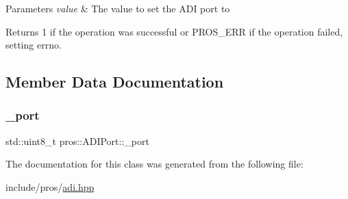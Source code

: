 \begin{DoxyParams}{Parameters}
{\em value} & The value to set the A\+DI port to\\
\hline
\end{DoxyParams}
\begin{DoxyReturn}{Returns}
1 if the operation was successful or P\+R\+O\+S\+\_\+\+E\+RR if the operation failed, setting errno. 
\end{DoxyReturn}


\subsection{Member Data Documentation}
\mbox{\label{classpros_1_1ADIPort_a75f3b6c1ae3c1f6b755e18444e7559d6}} 
\subsubsection{\texorpdfstring{\_port}{\_port}}
{\footnotesize\ttfamily std\+::uint8\+\_\+t pros\+::\+A\+D\+I\+Port\+::\+\_\+port\hspace{0.3cm}{\ttfamily [protected]}}



The documentation for this class was generated from the following file\+:\begin{DoxyCompactItemize}
\item 
include/pros/\mbox{\hyperlink{adi_8hpp}{adi.\+hpp}}\end{DoxyCompactItemize}
